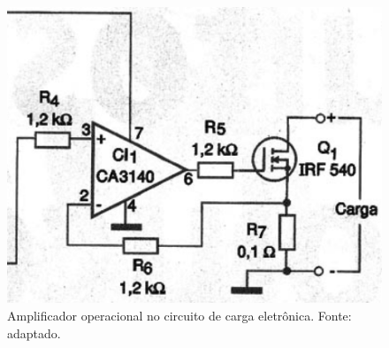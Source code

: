 \FloatBarrier
\begin{figure}[!htbp]
	\centering
	\includegraphics[scale=0.7]{imagens/CEAMP}
	\caption{Amplificador operacional no circuito de carga eletrônica. Fonte:  adaptado.}
	\label{fig:CEAMP}
\end{figure}
\FloatBarrier


